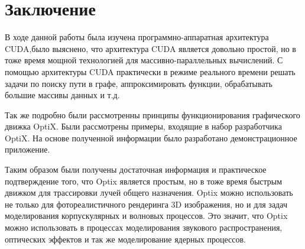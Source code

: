 \section*{\centering Заключение}

В ходе данной работы была изучена  программно-аппаратная архитектура CUDA,было выяснено, что архитектура CUDA является довольно простой, но в тоже время мощной технологией для массивно-параллельных вычислений. С помощью архитектуры CUDA практически в режиме реального времени решать задачи по поиску пути в графе, аппроксимировать функции, обрабатывать большие массивы данных и т.д.

 Так же подробно были рассмотренны принципы функционирования графического движка OptiX. Были рассмотрены примеры, входящие в набор разработчика OptiX. На основе полученной информации было разработано демонстрационное приложение. 

Таким образом были получены достаточная информация и практическое подтверждение того, что Optix является простым, но в тоже время быстрым движком для трассировки лучей общего назначения. Optix можно использовать не только для фотореалистичного рендеринга 3D изображения, но и для задач моделирования корпускулярных и волновых процессов. Это значит, что Optix можно использовать в процессах моделирования звукового распространения, оптических эффектов и так же моделирование ядерных процессов. 